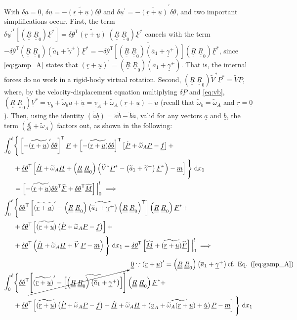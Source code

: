 \documentclass[12pt,a4paper,oneside,english]{abntex2} %
\newcommand{\vect}[1]{\underline{#1}}
\newcommand{\uvec}[1]{\overline{#1}}
\def\tens#1{\underline{\underline{#1}}}
\def\til#1{\widetilde{#1}}
\def\lb{\left[}
\def\rb{\right]}
\def\lp{\left(}
\def\rp{\right)}
\def\T{\mathsf{T}}
\def\xo{x_1}
\def\aone{\uvec{a}_1}
\def\aonetil{\til{a}_1}
\def\R{\tens{R}}
\def\Rz{\R_0}
\def\r{\vect{r}}
\def\rdot{\dot{\r}}
\def\u{\vect{u}}
\def\udot{\dot{\u}}
\def\uprime{\u^{\prime}}
\def\uprimeT{\u^{\prime^\T}}
\def\vb{\vect{v}_b}
\def\vA{\vect{v}_A}
\def\omAtil{\til{\omega}_A}
\def\omtil{\til{\omega}_b}
\def\gam{\vect{\gamma}}
\def\gamp{\gam^{+}}
\def\gamptil{\til{\gamma}^{+}}
\def\V{\vect{V}}
\def\Vs{\V^{*}}
\def\Vtils{\til{V}^{*}}
\def\P{\vect{P}}
\def\Pdot{\dot{\P}}
\def\Ps{\P^*}
\def\Hv{\vect{H}}
\def\Hvdot{\dot{\Hv}}
\def\F{\vect{F}}
\def\Fhat{\widehat{\F}}
\def\Fs{\F^*}
\def\M{\vect{M}}
\def\Mhat{\widehat{\M}}
\def\f{\vect{f}}
\def\m{\vect{m}}
\def\delP{\vect{\delta P}}
\def\zv{\vect{0}}
\def\intl{\int_{0}^{\ell}}
\def\d{\textnormal{d}}
\def\RRz{\lp\R\;\Rz\rp}
\def\RRzT{\RRz^\T}
\begin{document}
{With $\vect{\delta a}=\zv$, $\delta\u=-\til{\lp\r+\u\rp}\vect{\delta\theta}$ and $\delta\uprime=-\til{\lp\r+\u\rp}^\prime\vect{\delta\theta}$, and two important simplifications occur. First, the term $\delta\uprimeT\lb\RRz\Fs\rb = \vect{\delta\theta}^\T\til{\lp\r+\u\rp}^\prime\RRz\Fs$ cancels with the term $-\vect{\delta\theta}^\T\RRz\lp\aonetil+\gamptil\rp\Fs = -\vect{\delta\theta}^\T\til{\lb\RRz\lp\aone+\gamp\rp\rb}\RRz\Fs$, since \cref{eq:gamp_A} states that $\lp\r+\u\rp^\prime=\RRz\lp\aone+\gamp\rp$. That is, the internal forces do no work in a rigid-body virtual rotation. Second, $\RRz\Vtils\Ps = \til{V}\P$, where, by the velocity-displacement equation multiplying $\delP$ and \cref{eq:vb}, $\RRz\Vs = \vb + \omtil\u + \udot = \vA + \omAtil\lp\r+\u\rp + \udot$ (recall that $\omtil=\omAtil$ and $\rdot=\zv$). Then, using the identity $\til{\lp\til{a}\vect{b}\rp} = \til{a}\til{b} - \til{b}\til{a}$, valid for any vectors $\vect{a}$ and $\vect{b}$, the term $\lp \frac{d}{dt} + \omAtil \rp$ factors out, as shown in the following:
\begin{align}
	\intl &\Biggl\{\Biggr. \lb-\til{\lp\r+\u\rp}^\prime\vect{\delta\theta}\rb^\T\F + \lb-\til{\lp\r+\u\rp}\vect{\delta\theta}\rb^\T\lb\Pdot+\omAtil\P-\f\rb +
	\nonumber \\ 
    & +\vect{\delta\theta}^\T\lb\Hvdot+\omAtil\Hv+\RRz\lp\Vtils\Ps-\lp\aonetil+\gamptil\rp\Fs\rp-\m\rb \Biggl.\Biggr\}\;\d \xo
    \nonumber \\
    &= \lb -\til{\lp\r+\u\rp}\vect{\delta\theta}^\T\Fhat + \vect{\delta\theta}^\T\Mhat \rb \Big|_{0}^{l} \implies
    \nonumber \\
    \intl &\Biggl\{\Biggr. \vect{\delta\theta}^\T \lb \til{\lp\r+\u\rp}^\prime - \RRz \til{\lp\aone+\gamp\rp} \RRzT \rb \RRz\Fs + 
    \nonumber \\ 
    & + \vect{\delta\theta}^\T \lb \til{\lp\r+\u\rp} \lp\Pdot+\omAtil\P-\f\rp \rb + \nonumber \\ 
    &+ \vect{\delta\theta}^\T \lp \Hvdot+\omAtil\Hv+\til{V}\,\P-\m \rp \Biggl.\Biggr\}\;\d \xo = \vect{\delta\theta}^\T \lb \Mhat + \til{\lp\r+\u\rp}\Fhat \rb \Big|_{0}^{l} \implies
    \nonumber \\
    \intl &\Biggl\{\Biggr. \vect{\delta\theta}^\T \cancelto{\tens{0} \because \lp\r+\u\rp^\prime = \RRz\lp\aone+\gamp\rp \text{cf. Eq. (\ref{eq:gamp_A})}}{\lb \til{\lp\r+\u\rp}^\prime - \til{\lb \RRz \lp\aone+\gamp\rp \rb} \rb} \RRz\Fs +
    \nonumber \\
    & +\vect{\delta\theta}^\T \lb \til{\lp\r+\u\rp} \lp\Pdot+\omAtil\P-\f\rp + \Hvdot+\omAtil\Hv+\til{\lp\vA+\omAtil(\r+\u)+\udot\rp}\,\P-\m \rb \Biggl.\Biggr\}\;\d \xo \nonumber \\ 

\end{align}}
\end{document}
